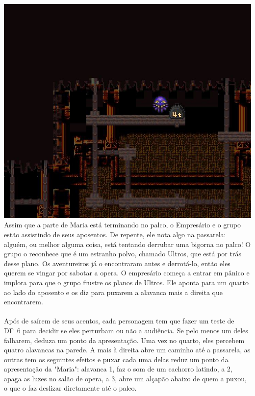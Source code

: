 \includegraphics[width=\columnwidth]{./art/mariaanddraco/ultros.png}
%
\vfill
%
Assim que a parte de Maria está terminando no palco, o Empresário e o grupo estão assistindo de seus aposentos.
De repente, ele nota algo na passarela: alguém, ou melhor alguma coisa, está tentando derrubar uma bigorna no palco!
O grupo o reconhece que é um estranho polvo, chamado Ultros, que está por trás desse plano.
Os aventureiros já o encontraram antes e derrotá-lo, então eles querem se vingar por sabotar a opera.
O empresário começa a entrar em pânico e implora para que o grupo frustre os planos de Ultros.
Ele aponta para um quarto ao lado do aposento e os diz para puxarem a alavanca mais a direita que encontrarem.
%
\newpage
%
\\\\
%
Após de saírem de seus acentos, cada personagem tem que fazer um teste de DF~6 para decidir se eles perturbam ou não a audiência. 
Se pelo menos um deles falharem, deduza um ponto da apresentação.
Uma vez no quarto, eles percebem quatro alavancas na parede. A mais à direita abre um caminho até a passarela, as outras tem os seguintes efeitos e puxar cada uma delas reduz um ponto da apresentação da "Maria": alavanca 1, faz o som de um cachorro latindo, a 2, apaga as luzes no salão de opera, a 3, abre um alçapão abaixo de quem a puxou, o que o faz deslizar diretamente até o palco.
